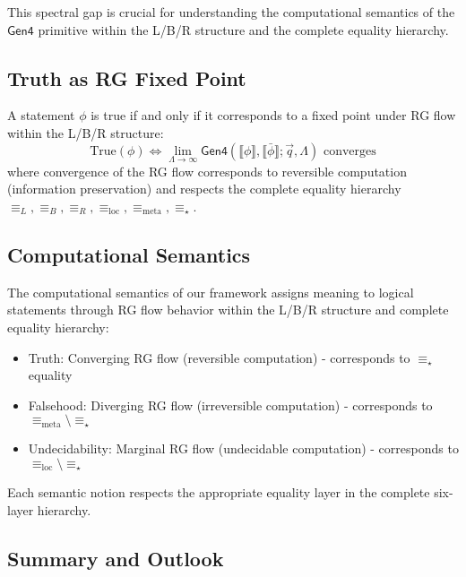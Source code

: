 This spectral gap is crucial for understanding the computational semantics of the $\mathsf{Gen4}$ primitive within the L/B/R structure and the complete equality hierarchy.

\subsection{Truth as RG Fixed Point}

\begin{theorem}
\label{thm:truth-rg-fixed-point-lbr}
A statement $\phi$ is true if and only if it corresponds to a fixed point under RG flow within the L/B/R structure:
\[
\text{True}(\phi) \Leftrightarrow \lim_{\Lambda \to \infty} \mathsf{Gen4}(\llbracket\phi\rrbracket, \llbracket\bar{\phi}\rrbracket; \vec{q}, \Lambda) \text{ converges}
\]
where convergence of the RG flow corresponds to reversible computation (information preservation) and respects the complete equality hierarchy $\equiv_L, \equiv_B, \equiv_R, \equiv_{\text{loc}}, \equiv_{\text{meta}}, \equiv_\star$.
\end{theorem}

\subsection{Computational Semantics}

\begin{definition}
\label{def:computational-semantics-lbr}
The computational semantics of our framework assigns meaning to logical statements through RG flow behavior within the L/B/R structure and complete equality hierarchy:
\begin{itemize}
\item Truth: Converging RG flow (reversible computation) - corresponds to $\equiv_\star$ equality
\item Falsehood: Diverging RG flow (irreversible computation) - corresponds to $\equiv_{\text{meta}} \setminus \equiv_\star$
\item Undecidability: Marginal RG flow (undecidable computation) - corresponds to $\equiv_{\text{loc}} \setminus \equiv_\star$
\end{itemize}
Each semantic notion respects the appropriate equality layer in the complete six-layer hierarchy.
\end{definition}

\subsection{Summary and Outlook}

